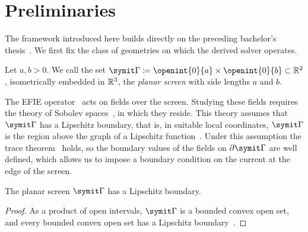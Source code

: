 \section{Preliminaries}
\label{sec:preliminaries}

The framework introduced here builds directly on the preceding bachelor's thesis~\cite{machacek2025method}. We first fix the class of geometries on which the derived solver operates. 

\begin{definition}
\label{def:screen}
Let $a, b > 0$. We call the set $\srcRegion \coloneqq \openint{0}{a} \times \openint{0}{b} \subset \R^2$, isometrically embedded in $\mathbb{R}^3$, the \emph{planar screen} with side lengths $a$ and $b$.
\end{definition}

The \ac{EFIE} operator~\cite{buffa2003electric} acts on fields over the screen. Studying these fields requires the theory of Sobolev spaces~\cite[Ch.~3]{mclean2000strongly}, in which they reside. This theory assumes that $\srcRegion$ has a Lipschitz boundary, that is, in suitable local coordinates, $\srcRegion$ is the region above the graph of a Lipschitz function~\cite[p.~89]{mclean2000strongly}. Under this assumption the trace theorem~\cite[Thm.~3.37]{mclean2000strongly} holds, so the boundary values of the fields on $\partial\srcRegion$ are well defined, which allows us to impose a boundary condition on the current at the edge of the screen.

\begin{corollary}
\label{cor:screen-lipschitz}
The planar screen $\srcRegion$ has a Lipschitz boundary.
\end{corollary}

\begin{proof}
As a product of open intervals, $\srcRegion$ is a bounded convex open set, and every bounded convex open set has a Lipschitz boundary~\cite[Cor.~1.2.2.3]{grisvard1985elliptic}.
\end{proof}

